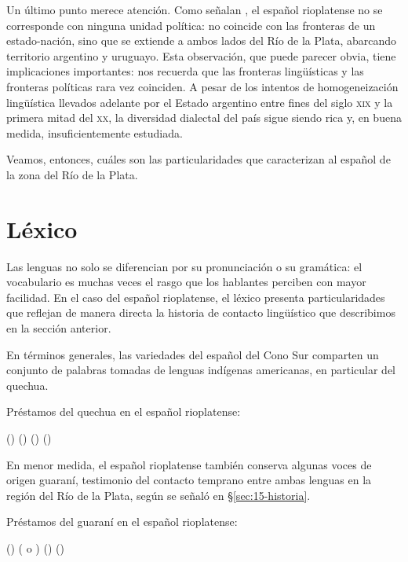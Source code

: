 Un último punto merece atención. Como señalan \textcite[12]{ditullio2011}, el
español rioplatense no se corresponde con ninguna unidad política: no coincide
con las fronteras de un estado-nación, sino que se extiende a ambos lados del Río
de la Plata, abarcando territorio argentino y uruguayo. Esta observación, que
puede parecer obvia, tiene implicaciones importantes: nos recuerda que las
fronteras lingüísticas y las fronteras políticas rara vez coinciden. A pesar de
los intentos de homogeneización lingüística llevados adelante por el Estado
argentino entre fines del siglo \textsc{xix} y la primera mitad del \textsc{xx},
la diversidad dialectal del país sigue siendo rica y, en buena medida,
insuficientemente estudiada.

Veamos, entonces, cuáles son las particularidades que caracterizan al español de
la zona del Río de la Plata.

\section{Léxico}\label{sec:15-lexico}

Las lenguas no solo se diferencian por su pronunciación o su gramática: el
vocabulario es muchas veces el rasgo que los hablantes perciben con mayor
facilidad. En el caso del español rioplatense, el léxico presenta
particularidades que reflejan de manera directa la historia de contacto
lingüístico que describimos en la sección anterior.

En términos generales, las variedades del español del Cono Sur comparten un
conjunto de palabras tomadas de lenguas indígenas americanas, en particular del
quechua.

\begin{exe}
  \ex\label{ex:15-quechua} Préstamos del quechua en el español rioplatense:
    \begin{xlist}
      \ex {} ()
      \ex {} ()
      \ex {} ()
      \ex {} ()
    \end{xlist}
\end{exe}

En menor medida, el español rioplatense también conserva algunas voces de origen
guaraní, testimonio del contacto temprano entre ambas lenguas en la región del
Río de la Plata, según se señaló en §\ref{sec:15-historia}.

\begin{exe}
  \ex\label{ex:15-guarani} Préstamos del guaraní en el español rioplatense:
    \begin{xlist}
      \ex {} ()
      \ex {} ( o )
      \ex {} ()
      \ex {} ()
    \end{xlist}
\end{exe}

